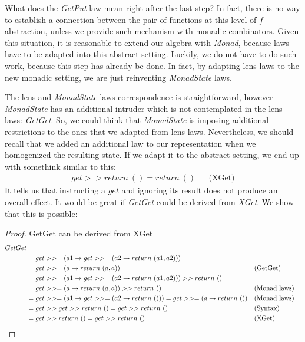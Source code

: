 \documentclass[a4paper]{article}
\begin{document}
What does the \emph{GetPut} law mean right after the last step? In fact, there
is no way to establish a connection between the pair of functions at this level
of $f$ abstraction, unless we provide such mechanism with monadic combinators.
Given this situation, it is reasonable to extend our algebra with \emph{Monad},
because laws have to be adapted into this abstract setting. Luckily, we do not
have to do such work, because this step has already be done. In fact, by
adapting lens laws to the new monadic setting, we are just reinventing
\emph{MonadState} laws.

The lens and \emph{MonadState} laws correspondence is straightforward, however
\emph{MonadState} has an additional intruder which is not contemplated in the
lens laws: \emph{GetGet}. So, we could think that \emph{MonadState} is imposing
additional restrictions to the ones that we adapted from lens laws.
Nevertheless, we should recall that we added an additional law to our
representation when we homogenized the resulting state. If we adapt it to the
abstract setting, we end up with somethink similar to this:
\begin{align*}
  get >> return\ () = return\ () &&\text{(XGet)}
\end{align*}
It tells us that instructing a $get$ and ignoring its result does not produce an
overall effect. It would be great if \emph{GetGet} could be derived from
\emph{XGet}. We show that this is possible:

\begin{proof}
  GetGet can be derived from XGet
  \begin{align*}
    GetGet \\
    &= get >>= (a1 \rightarrow get >>= (a2 \rightarrow return\ (a1, a2))) =\\ &\ \ \ \ get >>= (a \rightarrow return\ (a, a)) &&\text{(GetGet)} \\
    &= get >>= (a1 \rightarrow get >>= (a2 \rightarrow return\ (a1, a2))) >> return\ () =\\&\ \ \ \ get >>= (a \rightarrow return\ (a, a)) >> return\ () &&\text{(Monad laws)} \\
    &= get >>= (a1 \rightarrow get >>= (a2 \rightarrow return\ ())) = get >>= (a \rightarrow return\ ()) &&\text{(Monad laws)} \\
    &= get >> get >> return\ () = get >> return\ () &&\text{(Syntax)} \\
    &= get >> return\ () = get >> return\ () &&\text{(XGet)}\qedhere
  \end{align*}
\end{proof}
\end{document}
